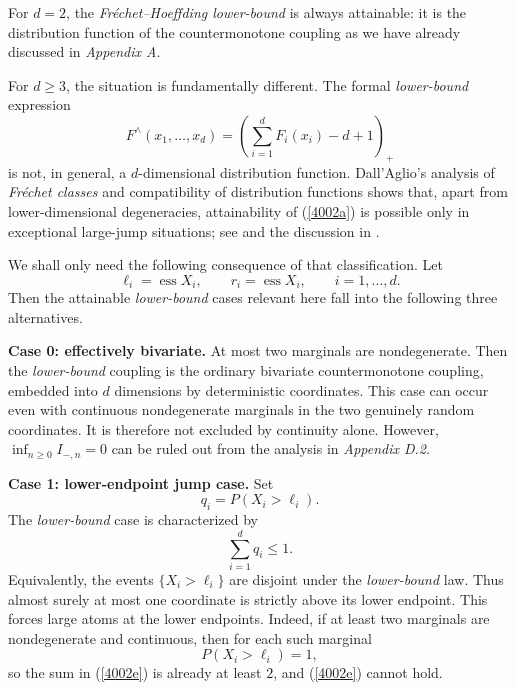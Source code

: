 \documentclass[onecolumn]{article}
\providecommand{\func}[1]{\operatorname{#1}}
\begin{document}
For $d=2$, the \textit{Fr\'{e}chet--Hoeffding lower-bound} is always
attainable: it is the distribution function of the countermonotone coupling
as we have already discussed in \textit{Appendix A.}

For $d\geq 3$, the situation is fundamentally different. The formal \textit{%
lower-bound} expression 
\begin{equation}
F^{\wedge }(x_{1},\ldots ,x_{d})=\left(
\sum_{i=1}^{d}F_{i}(x_{i})-d+1\right) _{+}  \label{4002a}
\end{equation}%
is not, in general, a $d$-dimensional distribution function. Dall'Aglio's
analysis of \textit{Fr\'{e}chet classes} and compatibility of distribution
functions shows that, apart from lower-dimensional degeneracies,
attainability of (\ref{4002a}) is possible only in exceptional large-jump
situations; see \cite{[76]} and the discussion in \cite[Chapter 6]{[5]}.

We shall only need the following consequence of that classification. Let 
\begin{equation}
\ell _{i}=\func{ess}X_{i},\qquad r_{i}=\func{ess}X_{i},\qquad i=1,\ldots ,d.
\label{4002b}
\end{equation}%
Then the attainable \textit{lower-bound} cases relevant here fall into the
following three alternatives.

\noindent \textbf{Case 0: effectively bivariate.} At most two marginals are
nondegenerate. Then the \textit{lower-bound} coupling is the ordinary
bivariate countermonotone coupling, embedded into $d$ dimensions by
deterministic coordinates. This case can occur even with continuous
nondegenerate marginals in the two genuinely random coordinates. It is
therefore not excluded by continuity alone. However, $\inf_{n\geq
0}I_{-,n}=0 $ can be ruled out from the analysis in \textit{Appendix D.2}.

\noindent \textbf{Case 1: lower-endpoint jump case.} Set 
\begin{equation}
q_{i}=P(X_{i}>\ell _{i}).  \label{4002c}
\end{equation}%
The \textit{lower-bound} case is characterized by 
\begin{equation}
\sum_{i=1}^{d}q_{i}\leq 1.  \label{4002d}
\end{equation}%
Equivalently, the events $\{X_{i}>\ell _{i}\}$ are disjoint under the 
\textit{lower-bound} law. Thus almost surely at most one coordinate is
strictly above its lower endpoint. This forces large atoms at the lower
endpoints. Indeed, if at least two marginals are nondegenerate and
continuous, then for each such marginal 
\begin{equation}
P(X_{i}>\ell _{i})=1,  \label{4002e}
\end{equation}%
so the sum in (\ref{4002e}) is already at least $2$, and (\ref{4002e})
cannot hold.
\end{document}
